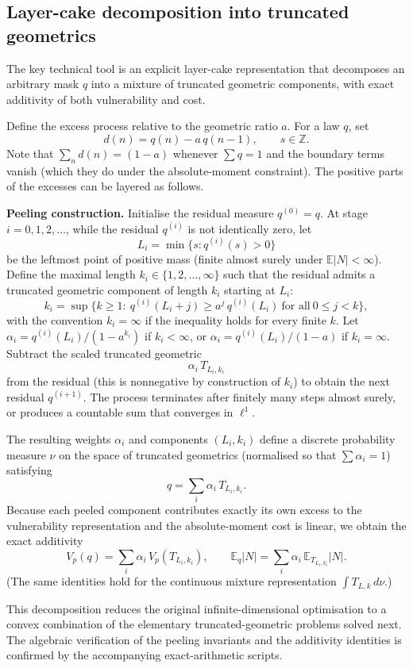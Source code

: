\documentclass[conference]{IEEEtran}
\newcommand{\Z}{\mathbb{Z}}
\newcommand{\E}{\mathbb{E}}
\begin{document}
\subsection{Layer-cake decomposition into truncated geometrics}
The key technical tool is an explicit layer-cake representation that decomposes an arbitrary mask \(q\) into a mixture of truncated geometric components, with exact additivity of both vulnerability and cost.

Define the excess process relative to the geometric ratio \(a\). For a law \(q\), set
\[
d(n)=q(n)-a\,q(n-1),\qquad s\in\Z.
\]
Note that \(\sum_n d(n)=(1-a)\) whenever \(\sum q=1\) and the boundary terms vanish (which they do under the absolute-moment constraint). The positive parts of the excesses can be layered as follows.

\textbf{Peeling construction.} Initialise the residual measure \(q^{(0)}=q\). At stage \(i=0,1,2,\dots\), while the residual \(q^{(i)}\) is not identically zero, let
\[
L_i=\min\{s:q^{(i)}(s)>0\}
\]
be the leftmost point of positive mass (finite almost surely under \(\E|N|<\infty\)). Define the maximal length \(k_i\in\{1,2,\dots,\infty\}\) such that the residual admits a truncated geometric component of length \(k_i\) starting at \(L_i\):
\[
k_i=\sup\bigl\{k\ge1:\ q^{(i)}(L_i+j)\ge a^j\,q^{(i)}(L_i)\ \text{for all}\ 0\le j<k\bigr\},
\]
with the convention \(k_i=\infty\) if the inequality holds for every finite \(k\). Let \(\alpha_i=q^{(i)}(L_i)/(1-a^{k_i})\) if \(k_i<\infty\), or \(\alpha_i=q^{(i)}(L_i)/(1-a)\) if \(k_i=\infty\). Subtract the scaled truncated geometric
\[
\alpha_i\,T_{L_i,k_i}
\]
from the residual (this is nonnegative by construction of \(k_i\)) to obtain the next residual \(q^{(i+1)}\). The process terminates after finitely many steps almost surely, or produces a countable sum that converges in \(\ell^1\).

The resulting weights \(\alpha_i\) and components \((L_i,k_i)\) define a discrete probability measure \(\nu\) on the space of truncated geometrics (normalised so that \(\sum\alpha_i=1\)) satisfying
\[
q=\sum_i\alpha_i\,T_{L_i,k_i}.
\]
Because each peeled component contributes exactly its own excess to the vulnerability representation and the absolute-moment cost is linear, we obtain the exact additivity
\[
V_p(q)=\sum_i\alpha_i\,V_p(T_{L_i,k_i}),\qquad
\E_q|N|=\sum_i\alpha_i\,\E_{T_{L_i,k_i}}|N|.
\]
(The same identities hold for the continuous mixture representation \(\int T_{L,k}\,d\nu\).)

This decomposition reduces the original infinite-dimensional optimisation to a convex combination of the elementary truncated-geometric problems solved next. The algebraic verification of the peeling invariants and the additivity identities is confirmed by the accompanying exact-arithmetic scripts.
\end{document}
